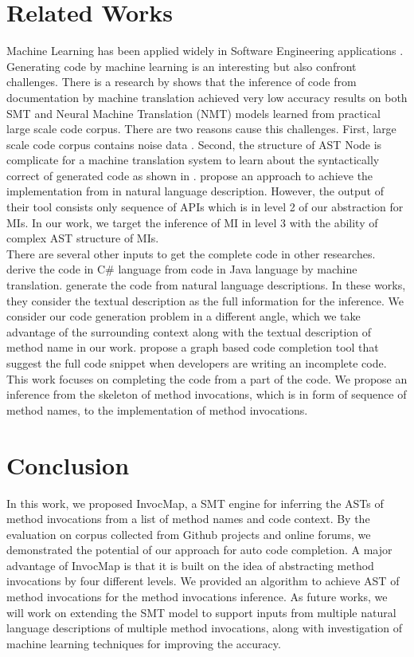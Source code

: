 \section{Related Works}
Machine Learning has been applied widely in Software Engineering applications \cite{Allamanis:2018:SML:3236632.3212695}. Generating code by machine learning is an interesting but also confront challenges. There is a research by \cite{DBLP:journals/corr/BaroneS17} shows that the inference of code from documentation by machine translation achieved very low accuracy results on both SMT and Neural Machine Translation (NMT) models learned from practical large scale code corpus. There are two reasons cause this challenges. First, large scale code corpus contains noise data \cite{Pascarella:2017:CCC:3104188.3104217}. Second, the structure of AST Node is complicate for a machine translation system to learn about the syntactically correct of generated code as shown in \cite{DBLP:journals/corr/BaroneS17}. \cite{Gu:2016:DAL:2950290.2950334} propose an approach to achieve the implementation from  in natural language description. However, the output of their tool consists only sequence of APIs which is in level 2 of our abstraction for MIs. In our work, we target the inference of MI in level 3 with the ability of complex AST structure of MIs.
\\
There are several other inputs to get the complete code in other researches. \cite{7372046} derive the code in C\# language from code in Java language by machine translation. \cite{Gvero:2015:SJE:2814270.2814295,Gu:2016:DAL:2950290.2950334} generate the code from natural language descriptions. In these works, they consider the textual description as the full information for the inference. We consider our code generation problem in a different angle, which we take advantage of the surrounding context along with the textual description of method name in our work. \cite{6227236} propose a graph based code completion tool that suggest the full code snippet when developers are writing an incomplete code. This work focuses on completing the code from a part of the code. We propose an inference from the skeleton of method invocations, which is in form of sequence of method names, to the implementation of method invocations.
\section*{Conclusion}
In this work, we proposed InvocMap, a SMT engine for inferring
the ASTs of method invocations from a list of method
names and code context. By the evaluation on corpus
collected from Github projects and online forums, we demonstrated
the potential of our approach for auto code completion. A major
advantage of InvocMap is that it is built on the idea of abstracting
method invocations by four different levels. We provided an algorithm
to achieve AST of method invocations for the method invocations inference. As
future works, we will work on extending the SMT model to
support inputs from multiple natural language descriptions of
multiple method invocations, along with investigation of machine learning techniques for improving the accuracy. 




